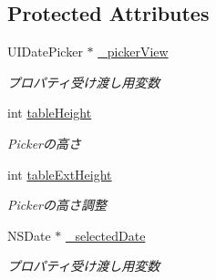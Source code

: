 \subsection*{Protected Attributes}
\begin{DoxyCompactItemize}
\item 
\hypertarget{interface_date_picker_alert_view_a37b437bca33a8ad380b3ceaceaf9edad}{
UIDatePicker $\ast$ \hyperlink{interface_date_picker_alert_view_a37b437bca33a8ad380b3ceaceaf9edad}{\_\-pickerView}}
\label{interface_date_picker_alert_view_a37b437bca33a8ad380b3ceaceaf9edad}

\begin{DoxyCompactList}\small\item\em プロパティ受け渡し用変数 \end{DoxyCompactList}\item 
\hypertarget{interface_date_picker_alert_view_a7c02b2a133948a1c496c8a5aea7e686b}{
int \hyperlink{interface_date_picker_alert_view_a7c02b2a133948a1c496c8a5aea7e686b}{tableHeight}}
\label{interface_date_picker_alert_view_a7c02b2a133948a1c496c8a5aea7e686b}

\begin{DoxyCompactList}\small\item\em Pickerの高さ \end{DoxyCompactList}\item 
\hypertarget{interface_date_picker_alert_view_a8b47a57a736107121d9b4513e6214fdb}{
int \hyperlink{interface_date_picker_alert_view_a8b47a57a736107121d9b4513e6214fdb}{tableExtHeight}}
\label{interface_date_picker_alert_view_a8b47a57a736107121d9b4513e6214fdb}

\begin{DoxyCompactList}\small\item\em Pickerの高さ調整 \end{DoxyCompactList}\item 
\hypertarget{interface_date_picker_alert_view_a3fe90197b07db9a2aa35c22901715dd9}{
NSDate $\ast$ \hyperlink{interface_date_picker_alert_view_a3fe90197b07db9a2aa35c22901715dd9}{\_\-selectedDate}}
\label{interface_date_picker_alert_view_a3fe90197b07db9a2aa35c22901715dd9}

\begin{DoxyCompactList}\small\item\em プロパティ受け渡し用変数 \end{DoxyCompactList}\end{DoxyCompactItemize}
